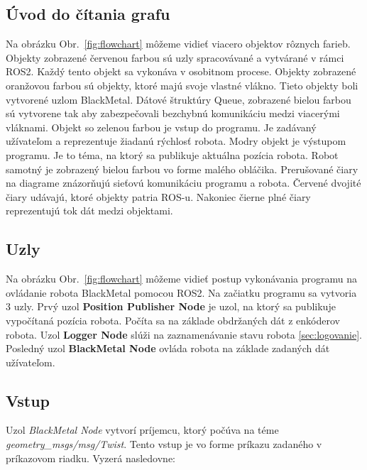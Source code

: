 \subsection{Úvod do čítania grafu}
\label{sec:citanie_grafu}

Na obrázku Obr.~\ref{fig:flowchart} môžeme vidieť viacero objektov rôznych farieb. Objekty zobrazené červenou farbou sú uzly spracovávané
a vytvárané v rámci ROS2. Každý tento objekt sa vykonáva v osobitnom procese. Objekty zobrazené oranžovou farbou sú objekty, ktoré majú svoje
vlastné vlákno. Tieto objekty boli vytvorené uzlom BlackMetal. Dátové štruktúry Queue, zobrazené bielou farbou sú vytvorene  tak aby
zabezpečovali bezchybnú komunikáciu medzi viacerými vláknami. Objekt so zelenou farbou je vstup do programu. Je zadávaný užívateľom
a reprezentuje žiadanú rýchlosť robota. Modry objekt je výstupom programu. Je to téma, na ktorý sa publikuje aktuálna pozícia robota.
Robot samotný je zobrazený bielou farbou vo forme malého obláčika. Prerušované čiary na diagrame znázorňujú sieťovú komunikáciu programu
a robota. Červené dvojité čiary udávajú, ktoré objekty patria ROS-u. Nakoniec čierne plné čiary reprezentujú tok dát medzi objektami.

\subsection{Uzly}

Na obrázku Obr.~\ref{fig:flowchart} môžeme vidieť postup vykonávania programu na ovládanie robota BlackMetal pomocou ROS2.
Na začiatku programu sa vytvoria 3 uzly. Prvý uzol \textbf{Position Publisher Node} je uzol, na ktorý sa publikuje vypočítaná pozícia robota.
Počíta sa na základe obdržaných dát z enkóderov robota. Uzol \textbf{Logger Node} slúži na zaznamenávanie stavu robota \ref{sec:logovanie}.
Posledný uzol \textbf{BlackMetal Node} ovláda robota na základe zadaných dát užívateľom.

\subsection{Vstup}

Uzol \textit{BlackMetal Node} vytvorí príjemcu, ktorý počúva na téme \textit{geometry\_msgs/msg/Twist}. Tento vstup je vo forme príkazu
zadaného v príkazovom riadku. Vyzerá nasledovne:



